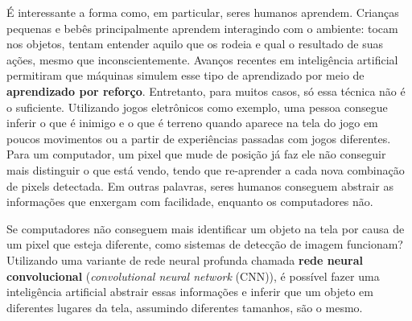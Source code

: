 É interessante a forma como, em particular, seres humanos aprendem.
Crianças pequenas e bebês principalmente aprendem interagindo com o ambiente: tocam nos objetos, tentam entender aquilo que os rodeia e qual o resultado de suas ações, mesmo que inconscientemente.
Avanços recentes em inteligência artificial permitiram que máquinas simulem esse tipo de aprendizado por meio de \textbf{aprendizado por reforço}.
Entretanto, para muitos casos, só essa técnica não é o suficiente.
Utilizando jogos eletrônicos como exemplo, uma pessoa consegue inferir o que é inimigo e o que é terreno quando aparece na tela do jogo em poucos movimentos ou a partir de experiências passadas com jogos diferentes.
Para um computador, um pixel que mude de posição já faz ele não conseguir mais distinguir o que está vendo, tendo que re-aprender a cada nova combinação de pixels detectada.
Em outras palavras, seres humanos conseguem abstrair as informações que enxergam com facilidade, enquanto os computadores não.

Se computadores não conseguem mais identificar um objeto na tela por causa de um pixel que esteja diferente, como sistemas de detecção de imagem funcionam?
Utilizando uma variante de rede neural profunda chamada \textbf{rede neural convolucional} (\textit{convolutional neural network} (CNN)), é possível fazer uma inteligência artificial abstrair essas informações e inferir que um objeto em diferentes lugares da tela, assumindo diferentes tamanhos, são o mesmo.

